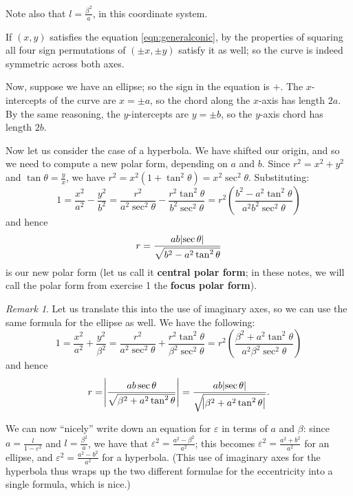 \documentclass[a4paper,leqno,10pt]{article}
\theoremstyle{exercise}
\theoremstyle{plain}
\theoremstyle{definition}
\theoremstyle{remark}
\newtheorem*{rem}{Remark}
\newcommand{\df}{\textbf}
\begin{document}
Note also that $ l = \frac{\beta^2}{a} $, in this coordinate system.

If $ (x,y) $ satisfies the equation \ref{eqn:generalconic}, by the properties of squaring all four sign permutations of $ (\pm x , \pm y) $ satisfy it as
well; so the curve is indeed symmetric across both axes.

Now, suppose we have an ellipse; so the sign in the equation is $ + $. The $ x$-intercepts of the curve are $ x = \pm a $, so the chord along
the $ x$-axis has length $ 2a $. By the same reasoning, the $ y$-intercepts are $ y = \pm b $, so the $ y$-axis chord has length $ 2b $.

Now let us consider the case of a hyperbola. We have shifted our origin, and so we need to compute a new polar form, depending on $ a $
and $ b $. Since $ r^2 = x^2 + y^2 $ and $ \tan \theta = \frac{y}{x} $, we have $ r^2 = x^2(1 + \tan^2 \theta) = x^2 \sec^2 \theta $.
Substituting:
\begin{displaymath}
  1 = \frac{x^2}{a^2} - \frac{y^2}{b^2} = \frac{r^2}{a^2\sec^2 \theta} - \frac{r^2 \tan^2 \theta}{b^2\sec^2 \theta} = r^2 \left( \frac{b^2 - a^2 \tan^2 \theta}{a^2b^2 \sec^2\theta} \right)
\end{displaymath}
and hence
\begin{equation}
  r = \frac{ab \abs{\sec \theta}}{\sqrt{b^2 - a^2 \tan^2 \theta}}
\end{equation}
is our new polar form (let us call it \df{central polar form}; in these notes, we will call the polar form from exercise 1 the \df{focus polar form}).

\begin{rem}
  Let us translate this into the use of imaginary axes, so we can use the same formula for the ellipse as well. We have the following:
  \begin{displaymath}
    1 = \frac{x^2}{a^2} + \frac{y^2}{\beta^2} = \frac{r^2}{a^2\sec^2 \theta} + \frac{r^2 \tan^2 \theta}{\beta^2\sec^2 \theta} = r^2 \left( \frac{\beta^2 + a^2 \tan^2 \theta}{a^2\beta^2 \sec^2\theta} \right)
  \end{displaymath}
  and hence
  \begin{equation}
    r = \abs{\frac{ab \sec \theta}{\sqrt{\beta^2 + a^2 \tan^2 \theta}}} = \frac{ab \abs{\sec \theta}}{\sqrt{\abs{\beta^2 + a^2 \tan^2 \theta}}}.
  \end{equation}

  We can now ``nicely'' write down an equation for $ \varepsilon $ in terms of $ a $ and $ \beta $: since $ a = \frac{l}{1 - \varepsilon^2} $
  and $ l = \frac{\beta^2}{a} $, we have that $ \varepsilon^2 = \frac{a^2 - \beta^2}{a^2} $; this becomes $ \varepsilon^2 = \frac{a^2 + b^2}{a^2} $
  for an ellipse, and $ \varepsilon^2 = \frac{a^2 - b^2}{a^2} $ for a hyperbola. (This use of imaginary axes for the hyperbola thus wraps up the
  two different formulae for the eccentricity into a single formula, which is nice.)
\end{rem}
\end{document}
